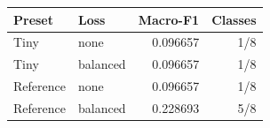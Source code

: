 \begin{tabular}{llrr}
\toprule
Preset & Loss & Macro-F1 & Classes \\
\midrule
Tiny & none & 0.096657 & 1/8 \\
Tiny & balanced & 0.096657 & 1/8 \\
Reference & none & 0.096657 & 1/8 \\
Reference & balanced & 0.228693 & 5/8 \\
\bottomrule
\end{tabular}
